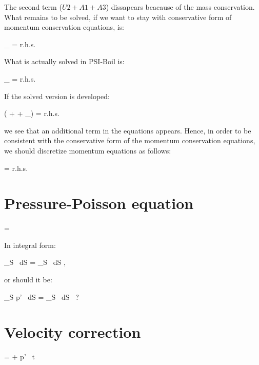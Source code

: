 \documentclass{report}
\begin{document}
The second term ($U2+A1+A3$) dissapears beacause of the mass conservation. What 
remains to be solved, if we want to stay with conservative form of momentum 
conservation equations, is:

\be
    _{}
  =
  r.h.s.
\ee

What is actually solved in PSI-Boil is:

\be
    _{}
  =
  r.h.s.
\ee

If the solved version is developed:

\be
    \rho \left(  
  + \uvw \nabla \phi
  + \underbrace{\phi \nabla \uvw}_{}\right)
  =
  r.h.s.
\ee

we see that an additional term in the equations appears. Hence, in order to be 
consistent with the conservative form of the momentum conservation equations,
we should discretize momentum equations as follows:

\be
    \rho {}
  =
  r.h.s.
\ee

\section{Pressure-Poisson equation}

\be
   = 
  \; \; \; \; [ \frac{1}{s^2} ]
\ee

In integral form:

\be
  \int_S  \, dS =  \int_S \uvw \, dS
  \; \; \; \; [ \frac{m^3}{s^2} ],    
\ee

or should it be:

\be
   \int_S \nabla p' \, dS =  \int_S \uvw \, dS
  \; \; \; \; [ \frac{m^3}{s^2} ] \, ?
\ee

\section{Velocity correction}

\be
  \uvw = \uvw +  \nabla p' \, \Delta t
\ee
\end{document}
